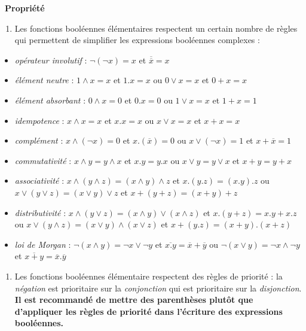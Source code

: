 \documentclass[
  11pt,
]{article}
\providecommand{\tightlist}{%
  \setlength{\itemsep}{0pt}\setlength{\parskip}{0pt}}
\newcounter{prop}
\newenvironment{propriete}[1]
{\par \medskip   \addtocounter{prop}{1} \noindent  
\begin{bclogo}[arrondi =0.1,  ombre = true, barre=none, logo=\bcbook, marge=4]{~\textbf{Propriété} \textbf{\theprop} {\itshape #1} }   \par}
{
\end{bclogo}
 \par \bigskip }
\newcounter{def}
\begin{document}
\begin{propriete}{}

\begin{enumerate}
\def\labelenumi{\arabic{enumi}.}
\tightlist
\item
  Les fonctions booléennes élémentaires respectent un certain nombre de
  règles qui permettent de simplifier les expressions booléennes
  complexes :
\end{enumerate}

\begin{itemize}
\tightlist
\item
  \emph{opérateur involutif} : \(\neg(\neg x) = x\) et
  \(\overline{\overline{x}}=x\)
\item
  \emph{élément neutre} : \(1 \wedge x = x\) et \(1 . x =x\) ou
  \(0 \vee x = x\) et \(0 + x =x\)
\item
  \emph{élément absorbant} : \(0 \wedge x = 0\) et \(0 . x =0\) ou
  \(1 \vee x = x\) et \(1 + x =1\)
\item
  \emph{idempotence} : \(x \wedge x = x\) et \(x . x =x\) ou
  \(x \vee x = x\) et \(x + x =x\)
\item
  \emph{complément} : \(x \wedge (\neg x) = 0\) et
  \(x . (\overline{x}) =0\) ou \(x \vee (\neg x) = 1\) et
  \(x + \overline{x} =1\)
\item
  \emph{commutativité} : \(x \wedge y = y \wedge x\) et
  \(x . y = y . x\) ou \(x \vee y = y \vee x\) et \(x + y = y + x\)
\item
  \emph{associativité} :
  \(x \wedge ( y \wedge z) = (x \wedge y) \wedge z\) et
  \(x . (y . z) = (x . y) . z\) ou
  \(x \vee ( y \vee z) = (x \vee y) \vee z\) et
  \(x + (y + z) = (x + y) + z\)
\item
  \emph{distributivité} :
  \(x \wedge ( y \vee z) = (x \wedge y) \vee (x \wedge z)\) et
  \(x . (y + z) = x . y + x . z\) ou
  \(x \vee ( y \wedge z) = (x \vee y) \wedge (x \vee z)\) et
  \(x + (y . z) = (x + y) . (x + z)\)
\item
  \emph{loi de Morgan} : \(\neg(x \wedge y) = \neg x \vee \neg y\) et
  \(\overline{x . y} = \overline{x} + \overline{y}\) ou
  \(\neg(x \vee y) = \neg x \wedge \neg y\) et
  \(\overline{x + y} = \overline{x} . \overline{y}\)
\end{itemize}

\begin{enumerate}
\def\labelenumi{\arabic{enumi}.}
\setcounter{enumi}{1}
\tightlist
\item
  Les fonctions booléennes élémentaire respectent des règles de priorité
  : la \emph{négation} est prioritaire sur la \emph{conjonction} qui est
  prioritaire sur la \emph{disjonction}.\\
  \textbf{Il est recommandé de mettre des parenthèses plutôt que
  d'appliquer les règles de priorité dans l'écriture des expressions
  booléennes.}
\end{enumerate}

\end{propriete}
\end{document}

